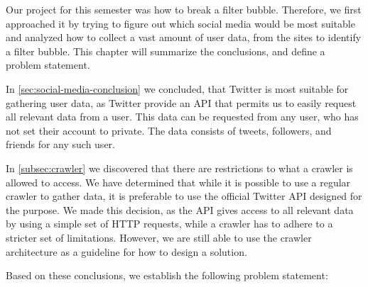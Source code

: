 Our project for this semester was how to break a filter bubble. Therefore, we
first approached it by trying to figure out which social media would be most
suitable and analyzed how to collect a vast amount of user data, from the sites
to identify a filter bubble.
This chapter will summarize the conclusions, and define a problem
statement.\nl

In \autoref{sec:social-media-conclusion} we concluded, that Twitter is most suitable
for gathering user data, as Twitter provide an \ac{API} that permits us to
easily request all relevant data from a user. This data can be requested from
any user, who has not set their account to private. The data consists of tweets,
followers, and friends for any such user.\nl

In \autoref{subsec:crawler} we discovered that there are restrictions to what
a crawler is allowed to access. We have determined that while it is possible to
use a regular crawler to gather data, it is preferable to use the official
Twitter \ac{API} designed for the purpose. We made this decision, as the
\ac{API} gives access to all relevant data by using a simple set of \ac{HTTP}
requests, while a crawler has to adhere to a stricter set of limitations.
However, we are still able to use the crawler architecture as a guideline for
how to design a solution.\nl {}


Based on these conclusions, we establish the following problem statement:

\begin{center}
\begin{minipage}{0.95\linewidth} 


\end{minipage}
\end{center}




